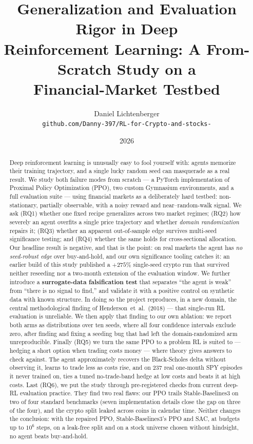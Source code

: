 \documentclass[10pt,twocolumn]{article}
\title{\vspace{-2.5em}\textbf{Generalization and Evaluation Rigor in Deep\\
Reinforcement Learning: A From-Scratch Study on a\\
Financial-Market Testbed}}
\author{Daniel Lichtenberger\\
\small\texttt{github.com/Danny-397/RL-for-Crypto-and-stocks-}}
\date{\vspace{-1.2em}\small 2026}
\newcommand{\pc}{\%}  %
\begin{document}
\maketitle

\begin{abstract}
\noindent Deep reinforcement learning is unusually easy to fool yourself with:
agents memorize their training trajectory, and a single lucky random seed can
masquerade as a real result. We study both failure modes from scratch --- a
PyTorch implementation of Proximal Policy Optimization (PPO), two custom
Gymnasium environments, and a full evaluation suite --- using financial markets
as a deliberately hard testbed: non-stationary, partially observable, with a
noisy reward and near--random-walk signal. We ask (RQ1) whether one fixed recipe
generalizes across two market regimes; (RQ2) how severely an agent overfits a
single price trajectory and whether \emph{domain randomization} repairs it;
(RQ3) whether an apparent out-of-sample edge survives multi-seed significance
testing; and (RQ4) whether the same holds for cross-sectional allocation. Our
headline result is negative, and that is the point: on real markets the agent
has \emph{no seed-robust edge} over buy-and-hold, and our own significance
tooling catches it: an earlier build of this study published a $+275\pc$
single-seed crypto run that survived neither reseeding nor a two-month extension
of the evaluation window. We further
introduce a \textbf{surrogate-data falsification test} that separates ``the agent
is weak'' from ``there is no signal to find,'' and validate it with a positive
control on synthetic data with known structure. In doing so the project
reproduces, in a new domain, the central methodological finding of
Henderson~et~al.\ (2018) --- that single-run RL evaluation is unreliable. We then
apply that finding to our own ablation: we report both arms as distributions over
ten seeds, where all four confidence intervals exclude zero, after finding and fixing
a seeding bug that had left the domain-randomized arm unreproducible. Finally (RQ5) we
turn the same PPO to a problem RL is suited to --- hedging a short option when trading
costs money --- where theory gives answers to check against. The agent approximately
recovers the Black-Scholes delta without observing it, learns to trade less as costs
rise, and on 237 real one-month SPY episodes it never trained on, ties a tuned
no-trade-band hedge at low costs and beats it at high costs. Last (RQ6), we put the
study through pre-registered checks from current deep-RL evaluation practice. They
find two real flaws: our PPO trails Stable-Baselines3 on two of four standard
benchmarks (seven implementation details close the gap on three of the four), and
the crypto split leaked across coins in calendar time. Neither changes the
conclusion: with the repaired PPO, Stable-Baselines3's PPO and SAC, at budgets up to
$10^6$ steps, on a leak-free split and on a stock universe chosen without hindsight,
no agent beats buy-and-hold.
\end{abstract}
\end{document}
